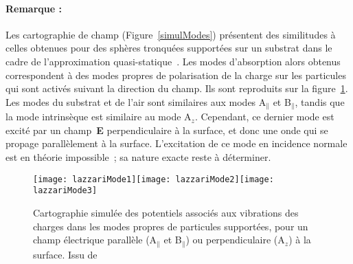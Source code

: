 \paragraph*{Remarque :} Les cartographie de champ (Figure~\ref{simulModes}) présentent des similitudes à celles obtenues pour des sphères tronquées supportées sur un substrat dans le cadre de l'approximation quasi-statique~\cite{Lazzari02d, lazzari03, lazzari14b}. Les modes d'absorption alors obtenus correspondent à des modes propres de polarisation de la charge sur les particules qui sont activés suivant la direction du champ. Ils sont reproduits sur la figure~\ref{lazzariModes}. Les modes du substrat et de l'air sont similaires aux modes A$_\parallel$ et B$_\parallel$, tandis que la mode intrinsèque est similaire au mode A$_z$. Cependant, ce dernier mode est excité par un champ~\textbf{E} perpendiculaire à la surface, et donc une onde qui se propage parallèlement à la surface. L'excitation de ce mode en incidence normale est en théorie impossible~; sa nature exacte reste à déterminer.\par 
\begin{figure}[!htb]
\centering
\texttt{[image: lazzariMode1]}\texttt{[image: lazzariMode2]}\texttt{[image: lazzariMode3]}
\caption{Cartographie simulée des potentiels associés aux vibrations des charges dans les modes propres de particules supportées, pour un champ électrique parallèle (A$_\parallel$ et B$_\parallel$) ou perpendiculaire (A$_z$) à la surface. Issu de~\cite{lazzari14b}}
\label{lazzariModes}
\end{figure}

